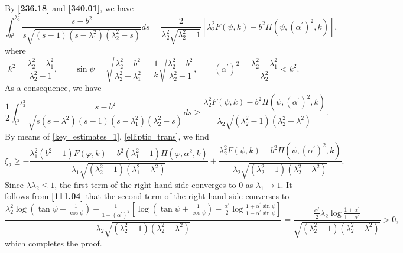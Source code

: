 \documentclass[11pt]{amsart}
\numberwithin{equation}{section}
\numberwithin{figure}{section}
\theoremstyle{plain} %
\theoremstyle{definition} %
\begin{document}
By  \textbf{[236.18]} and \textbf{[340.01]}, we have 
\[
\int_{b^2}^{\lambda_2^2} \frac{s-b^2}{s\sqrt{(s-1)(s-\lambda_1^2)(\lambda_2^2-s)}}ds 
 = \frac{2}{\lambda_2^2 \sqrt{\lambda_2^2-1}} \left[ \lambda_2^2 F (\psi,k) 
- b^2 \Pi (\psi,(\alpha^{\prime})^2,k) \right], 
\]
where 
\[
k^2 = \frac{\lambda_2^2-\lambda_1^2}{\lambda_2^2-1}, \qquad 
\sin \psi = \sqrt{\frac{\lambda_2^2-b^2}{\lambda_2^2-\lambda_1^2}}
 =\frac{1}{k} \sqrt{\frac{\lambda_2^2-b^2}{\lambda_2^2-1}}, \qquad
 (\alpha^{\prime})^2 = \frac{ \lambda_2^2-\lambda_1^2 }{\lambda_2^2}<k^2. %
\]
As a consequence, we have 
\begin{equation}\label{elliptic_trans}
\frac{1}{2}\int_{b^2}^{\lambda_2^2} \frac{s-b^2}{\sqrt{s(s-\lambda^2)(s-1)(s-\lambda_1^2)(\lambda_2^2-s)}}ds 
\geq 
\frac{\lambda_2^2 F (\psi,k) 
- b^2 \Pi (\psi,(\alpha^{\prime})^2,k)}{\lambda_2 \sqrt{(\lambda_2^2-1)(\lambda_2^2-\lambda^2)}}. 
\end{equation}
By means of \eqref{key_estimates_1}, \eqref{elliptic_trans}, we find 
\[
\xi_2 \geq -\frac{\lambda_1^2 (b^2-1) F (\varphi,k) 
- b^2 (\lambda_1^2-1) \Pi (\varphi,\alpha^2,k) }{\lambda_1 \sqrt{(\lambda_2^2-1)(\lambda_1^2-\lambda^2)}} 
 + \frac{\lambda_2^2 F (\psi,k) 
- b^2 \Pi (\psi,(\alpha^{\prime})^2,k) }{\lambda_2 \sqrt{(\lambda_2^2-1)(\lambda_2^2-\lambda^2)}}.
\]
Since $\lambda\lambda_2\leq 1$, the first term of the right-hand side converges to $0$ as $\lambda_1\to 1$. 
It follows from \textbf{[111.04]} that the second term of the right-hand side converses to 
\[
 \frac{\lambda_2^2 \log (\tan\psi+\frac{1}{\cos\psi})
- \frac{1}{1-(\alpha^{\prime})^2} [\log (\tan\psi+\frac{1}{\cos\psi}) - \frac{\alpha^{\prime}}{2} \log \frac{1+\alpha^{\prime} \sin\psi}{1-\alpha^{\prime} \sin\psi}]}{\lambda_2 \sqrt{(\lambda_2^2-1)(\lambda_2^2-\lambda^2)}} 
 = \frac{\frac{\alpha^{\prime}}{2}\lambda_2 \log \frac{1+\alpha^{\prime}}{1-\alpha^{\prime}}}{\sqrt{(\lambda_2^2-1)(\lambda_2^2-\lambda^2)}}>0,
\]
which completes the proof. 
\end{document}
